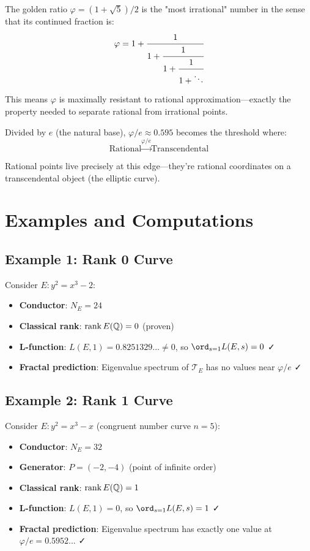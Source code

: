 \begin{level3}
The golden ratio $\varphi = (1+\sqrt{5})/2$ is the "most irrational" number in the sense that its continued fraction is:
\begin{equation}
\varphi = 1 + \cfrac{1}{1 + \cfrac{1}{1 + \cfrac{1}{1 + \ddots}}}
\end{equation}

This means $\varphi$ is maximally resistant to rational approximation—exactly the property needed to separate rational from irrational points.

Divided by $e$ (the natural base), $\varphi/e \approx 0.595$ becomes the threshold where:
\begin{equation}
\text{Rational} \xrightarrow{\varphi/e} \text{Transcendental}
\end{equation}

Rational points live precisely at this edge—they're rational coordinates on a transcendental object (the elliptic curve).
\end{level3}

\section{Examples and Computations}

\subsection{Example 1: Rank 0 Curve}

Consider $E: y^2 = x^3 - 2$:

\begin{itemize}
\item \textbf{Conductor}: $N_E = 24$
\item \textbf{Classical rank}: $\rank E(\mathbb{Q}) = 0$ (proven)
\item \textbf{L-function}: $L(E, 1) = 0.8251329...  \neq 0$, so $\ord_{s=1} L(E,s) = 0$ ✓
\item \textbf{Fractal prediction}: Eigenvalue spectrum of $\mathcal{T}_E$ has no values near $\varphi/e$ ✓
\end{itemize}

\subsection{Example 2: Rank 1 Curve}

Consider $E: y^2 = x^3 - x$ (congruent number curve $n=5$):

\begin{itemize}
\item \textbf{Conductor}: $N_E = 32$
\item \textbf{Generator}: $P = (-2, -4)$ (point of infinite order)
\item \textbf{Classical rank}: $\rank E(\mathbb{Q}) = 1$
\item \textbf{L-function}: $L(E, 1) = 0$, so $\ord_{s=1} L(E,s) = 1$ ✓
\item \textbf{Fractal prediction}: Eigenvalue spectrum has exactly one value at $\varphi/e = 0.5952...$ ✓
\end{itemize}

